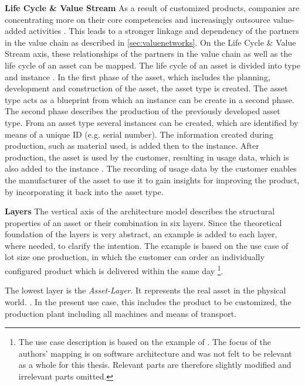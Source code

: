 \textbf{Life Cycle \& Value Stream} As a result of customized products, companies are concentrating more on their core competencies and increasingly outsource value-added activities \cite[p. 11]{Arnold2018DigitaleMittelstand}. This leads to a stronger linkage and dependency of the partners in the value chain as described in \ref{sec:valuenetworks}. On the Life Cycle \& Value Stream axis, these relationships of the partners in the value chain as well as the life cycle of an asset can be mapped. The life cycle of an asset is divided into type and instance \cite[p. 43]{Heidel2017ReferenzarchitekturmodellIndustrie4.0Komponente}. In the first phase of the asset, which includes the planning, development and construction of the asset, the asset type is created. The asset type acts as a blueprint from which an instance can be create in a second phase. The second phase describes the production of the previously developed asset type. From an asset type several instances can be created, which are identified by means of a unique ID (e.g. serial number). The information created during production, such as material used, is added then to the instance. After production, the asset is used by the customer, resulting in usage data, which is also added to the instance \cite[p. 43]{Heidel2017ReferenzarchitekturmodellIndustrie4.0Komponente}. The recording of usage data by the customer enables the manufacturer of the asset to use it to gain insights for improving the product, by incorporating it back into the asset type.
    
\textbf{Layers} The vertical axis of the architecture model describes the structural properties of an asset or their combination in six layers. Since the theoretical foundation of the layers is very abstract, an example is added to each layer, where needed, to clarify the intention. The example is based on the use case of lot size one production, in which the customer can order an individually configured product which is delivered within the same day \footnote{The use case description is based on the example of \citet[p. 39 - 41]{Anderl2016Softwarearchitekturen4.0}. The focus of the authors' mapping is on software architecture and was not felt to be relevant as a whole for this thesis. Relevant parts are therefore slightly modified and irrelevant parts omitted.}. 
    
The lowest layer is the \textit{Asset-Layer}. It represents the real asset in the physical world. \cite[p. 46]{Heidel2017ReferenzarchitekturmodellIndustrie4.0Komponente}. In the present use case, this includes the product to be customized, the production plant including all machines and means of transport. 
    

